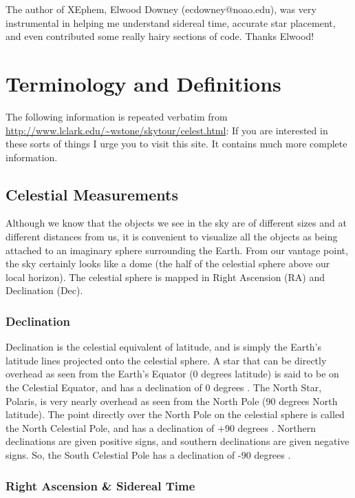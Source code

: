 \documentclass[12pt]{article}
\begin{document}
The author of XEphem, Elwood Downey (ecdowney@noao.edu), was very
instrumental in helping me understand sidereal time, accurate star
placement, and even contributed some really hairy sections of code.
Thanks Elwood!


\section{Terminology and Definitions}

The following information is repeated verbatim from
\url{http://www.lclark.edu/~wstone/skytour/celest.html}: If you are
interested in these sorts of things I urge you to visit this site.  It
contains much more complete information.

\subsection{Celestial Measurements} 

Although we know that the objects we see in the sky are of different
sizes and at different distances from us, it is convenient to
visualize all the objects as being attached to an imaginary sphere
surrounding the Earth.  From our vantage point, the sky certainly
looks like a dome (the half of the celestial sphere above our local
horizon).  The celestial sphere is mapped in Right Ascension (RA) and
Declination (Dec).

\subsubsection{Declination}

Declination is the celestial equivalent of latitude, and is simply the
Earth's latitude lines projected onto the celestial sphere. A star
that can be directly overhead as seen from the Earth's Equator (0
degrees latitude) is said to be on the Celestial Equator, and has a
declination of 0 degrees . The North Star, Polaris, is very nearly
overhead as seen from the North Pole (90 degrees North latitude). The
point directly over the North Pole on the celestial sphere is called
the North Celestial Pole, and has a declination of +90 degrees .
Northern declinations are given positive signs, and southern
declinations are given negative signs. So, the South Celestial Pole
has a declination of -90 degrees .

\subsubsection{Right Ascension \& Sidereal Time}
\end{document}
